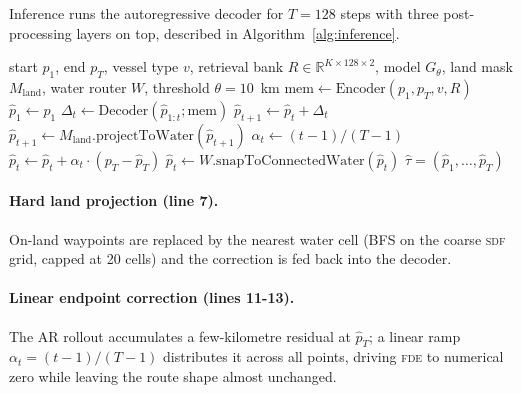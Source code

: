 \documentclass[oneside, a4paper, onecolumn, 11pt]{article}
\newcommand{\fde}{\textsc{fde}}
\newcommand{\sdf}{\textsc{sdf}}
\begin{document}
Inference runs the autoregressive decoder for $T = 128$ steps with
three post-processing layers on top, described in
Algorithm~\ref{alg:inference}.

\begin{algorithm}[h]
\caption{Inference: production routing.}
\label{alg:inference}
\begin{algorithmic}[1]
\REQUIRE start $p_1$, end $p_T$, vessel type $v$,
         retrieval bank $R \in \mathbb{R}^{K \times 128 \times 2}$,
         model $G_\theta$, land mask $M_{\mathrm{land}}$,
         water router $W$, threshold $\theta = 10$~km
\STATE $\mathrm{mem} \leftarrow \mathrm{Encoder}(p_1, p_T, v, R)$
\STATE $\hat p_1 \leftarrow p_1$
  \STATE $\Delta_t \leftarrow
          \mathrm{Decoder}(\hat p_{1:t}; \mathrm{mem})$
  \STATE $\hat p_{t+1} \leftarrow \hat p_t + \Delta_t$
    \STATE $\hat p_{t+1} \leftarrow
            M_{\mathrm{land}}.\mathrm{projectToWater}(\hat p_{t+1})$
  \ENDIF
\ENDFOR
\STATE {}
  \STATE $\alpha_t \leftarrow (t - 1) / (T - 1)$
  \STATE $\hat p_t \leftarrow \hat p_t + \alpha_t \cdot
                              (p_T - \hat p_T)$
\ENDFOR
\STATE {}
    \STATE $\hat p_t \leftarrow W.\mathrm{snapToConnectedWater}(\hat p_t)$
  \ENDIF
\ENDFOR
\RETURN $\hat \tau = (\hat p_1, \ldots, \hat p_T)$
\end{algorithmic}
\end{algorithm}

\paragraph{Hard land projection (line 7).}
On-land waypoints are replaced by the nearest water cell (BFS on the
coarse \sdf{} grid, capped at 20 cells) and the correction is fed
back into the decoder.

\paragraph{Linear endpoint correction (lines 11-13).}
The AR rollout accumulates a few-kilometre residual at $\hat p_T$; a
linear ramp $\alpha_t = (t-1)/(T-1)$ distributes it across all points,
driving \fde{} to numerical zero while leaving the route shape almost
unchanged.
\end{document}
